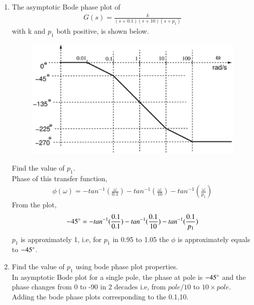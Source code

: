 \begin{enumerate}[label=\thesubsection.\arabic*.,ref=\thesubsection.\theenumi]


\item The asymptotic Bode phase plot of 
%
\begin{align}
\label{eq:ee18btech11037_gs}
G(s) = \frac{k}{(s+0.1)(s+10)(s+{p_1})}
\end{align}
%
with k and $p_1$ both positive, is shown below.
\begin{figure}[!ht]
\centering
\includegraphics[width=\columnwidth]{figs/ee18btech11037/ee18btech11037.eps}
\caption{}
\label{fig:ee18btech11037}
\end{figure}
Find the value of \textit{$p_1$}.
\\
\solution
Phase of this transfer function,
\begin{align}
\phi(\omega) = -tan^{-1}(\frac{\omega}{0.1}) -tan^{-1}(\frac{\omega}{10}) -tan^{-1}(\frac{\omega}{p_1})
\end{align}
From the plot,
\begin{align}
-45\degree = -tan^{-1}(\frac{0.1}{0.1}) -tan^{-1}(\frac{0.1}{10}) -tan^{-1}(\frac{0.1}{p_1})
\end{align}
 $p_1$ is approximately 1, i.e, for $p_1$ in 0.95 to 1.05 the $\phi$ is approximately equals to $-45\degree$.
%
\item Find the value of $p_1$ using bode phase plot properties.
\\
\solution In asymptotic Bode plot for a single pole, the phase at pole is $-45\degree$ and the phase changes from 0 to -90 in 2 decades i.e, from $pole/10$ to $10\times pole$. 
\\
Adding the bode phase plots corresponding to the 0.1,10.
\begin{figure}[!ht]
\centering

\end{figure}
\end{enumerate}
